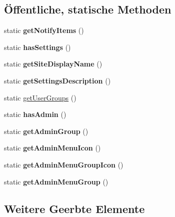 \subsection*{Öffentliche, statische Methoden}
\begin{DoxyCompactItemize}
\item 
\mbox{\label{classelternmailsender_a30a78fe812eb880923fa44d6b8b7f6df}} 
static {\bfseries get\+Notify\+Items} ()
\item 
\mbox{\label{classelternmailsender_adad15a063367b8033feefdcf42eee57a}} 
static {\bfseries has\+Settings} ()
\item 
\mbox{\label{classelternmailsender_a1869e5772d51dcfe0a31945522460b7e}} 
static {\bfseries get\+Site\+Display\+Name} ()
\item 
\mbox{\label{classelternmailsender_ac7a53b76e401b8e65c0e97a3ddaac70b}} 
static {\bfseries get\+Settings\+Description} ()
\item 
static \mbox{\hyperlink{classelternmailsender_af90d3c178b44724c1562d99d64cd7f04}{get\+User\+Groups}} ()
\item 
\mbox{\label{classelternmailsender_a5f23ef52e142febaffd5f9559755c3a2}} 
static {\bfseries has\+Admin} ()
\item 
\mbox{\label{classelternmailsender_a4be02b98b1741305d892bb9e830cd1e8}} 
static {\bfseries get\+Admin\+Group} ()
\item 
\mbox{\label{classelternmailsender_a4ae95eba7b1c90fcfe8b2ca689daffa3}} 
static {\bfseries get\+Admin\+Menu\+Icon} ()
\item 
\mbox{\label{classelternmailsender_a7afcd24daf8a65d1d82872dbbb465f79}} 
static {\bfseries get\+Admin\+Menu\+Group\+Icon} ()
\item 
\mbox{\label{classelternmailsender_a2e6df1e8bcf85144a7c9d4d0f7a048e8}} 
static {\bfseries get\+Admin\+Menu\+Group} ()
\end{DoxyCompactItemize}
\subsection*{Weitere Geerbte Elemente}


